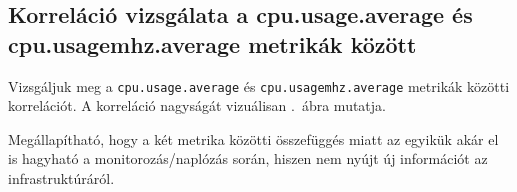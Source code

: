 \documentclass[a4paper,10pt,titlepage]{article}
\newcommand{\todo}[1]{
    \vfill
    \begingroup
        \setlength{\parindent}{0cm}
        \fcolorbox{todofrszin}{todobgszin}{
            \parbox{\textwidth}{
                \vskip10pt
                \leftskip10pt
                \rightskip10pt
            
                \emph{TODO: #1}
  
                \vskip10pt
            }
        }
    \endgroup
    \vfill
}
\begin{document}
%
%

\subsection{Korreláció vizsgálata a cpu.usage.average és cpu.usagemhz.average metrikák között}

Vizsgáljuk meg a \texttt{cpu.usage.average} és \texttt{cpu.usagemhz.average} metrikák közötti korrelációt. A korreláció nagyságát vizuálisan .~ábra mutatja.

Megállapítható, hogy a két metrika közötti összefüggés miatt az egyikük akár el is hagyható a monitorozás/naplózás során, hiszen nem nyújt új információt az infrastruktúráról. 
\end{document}
